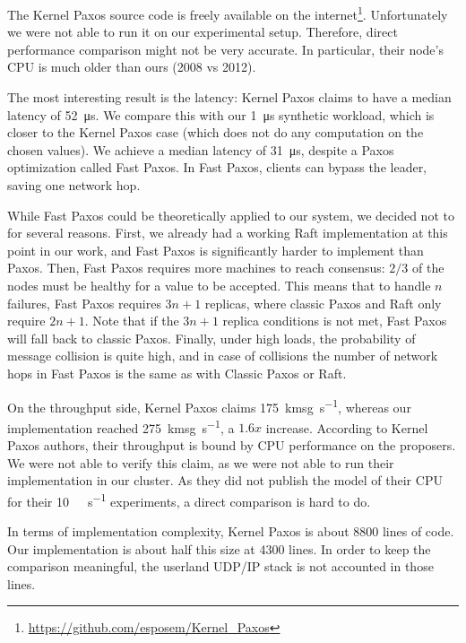 The Kernel Paxos source code is freely available on the internet\footnote{\url{https://github.com/esposem/Kernel_Paxos}}.
Unfortunately we were not able to run it on our experimental setup.
Therefore, direct performance comparison might not be very accurate.
In particular, their node's CPU is much older than ours (2008 vs 2012).

The most interesting result is the latency: Kernel Paxos claims to have a median latency of \SI{52}{\micro\second}.
We compare this with our \SI{1}{\micro\second} synthetic workload, which is closer to the Kernel Paxos case (which does not do any computation on the chosen values).
We achieve a median latency of \SI{31}{\micro\second}, despite a Paxos optimization called Fast Paxos\cite{lamport2006fast}.
In Fast Paxos, clients can bypass the leader, saving one network hop.

While Fast Paxos could be theoretically applied to our system, we decided not to for several reasons.
First, we already had a working Raft implementation at this point in our work, and Fast Paxos is significantly harder to implement than Paxos.
Then, Fast Paxos requires more machines to reach consensus: $2/3$ of the nodes must be healthy for a value to be accepted.
This means that to handle $n$ failures, Fast Paxos requires $3n + 1$ replicas, where classic Paxos and Raft only require $2n + 1$.
Note that if the $3n + 1$ replica conditions is not met, Fast Paxos will fall back to classic Paxos.
Finally, under high loads, the probability of message collision is quite high, and in case of collisions the number of network hops in Fast Paxos is the same as with Classic Paxos or Raft.

On the throughput side, Kernel Paxos claims \SI{175}{\kilo msg\per\second}, whereas our implementation reached \SI{275}{\kilo msg\per\second}, a $1.6x$ increase.
According to Kernel Paxos authors, their throughput is bound by CPU performance on the proposers.
We were not able to verify this claim, as we were not able to run their implementation in our cluster.
As they did not publish the model of their CPU for their \SI{10}{\giga\bit\per\second} experiments, a direct comparison is hard to do.

In terms of implementation complexity, Kernel Paxos is about 8800 lines of code.
Our implementation is about half this size at 4300 lines.
In order to keep the comparison meaningful, the userland UDP/IP stack is not accounted in those lines.

